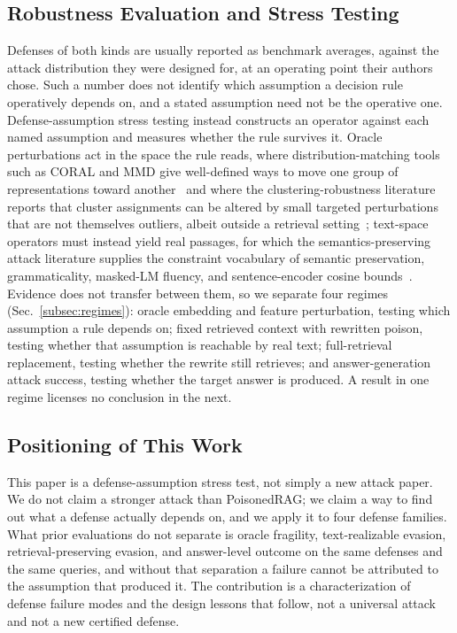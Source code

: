\documentclass[conference]{IEEEtran}
\begin{document}
\subsection{Robustness Evaluation and Stress Testing}
Defenses of both kinds are usually reported as benchmark averages, against the
attack distribution they were designed for, at an operating point their authors
chose. Such a number does not identify which assumption a decision rule
operatively depends on, and a stated assumption need not be the operative one.
Defense-assumption stress testing instead constructs an operator against each
named assumption and measures whether the rule survives it. Oracle perturbations
act in the space the rule reads, where distribution-matching tools such as CORAL
and MMD give well-defined ways to move one group of representations toward
another~\cite{sun2016coral,gretton2012mmd} and where the clustering-robustness
literature reports that cluster assignments can be altered by small targeted
perturbations that are not themselves outliers, albeit outside a retrieval
setting~\cite{chhabra2020clustering,cina2022clustering};
text-space operators must instead yield real passages, for which the
semantics-preserving attack literature supplies the constraint vocabulary of
semantic preservation, grammaticality, masked-LM fluency, and sentence-encoder
cosine bounds~\cite{jin2020textfooler,li2020bertattack,morris2020textattack}.
Evidence does not transfer between them, so we separate four regimes
(Sec.~\ref{subsec:regimes}): oracle embedding and feature perturbation, testing
which assumption a rule depends on; fixed retrieved context with rewritten poison,
testing whether that assumption is reachable by real text; full-retrieval
replacement, testing whether the rewrite still retrieves; and answer-generation
attack success, testing whether the target answer is produced. A result in one
regime licenses no conclusion in the next.

\subsection{Positioning of This Work}
This paper is a defense-assumption stress test, not simply a new attack paper. We
do not claim a stronger attack than PoisonedRAG; we claim a way to find out what
a defense actually depends on, and we apply it to four defense families. What
prior evaluations do not separate is oracle fragility, text-realizable evasion,
retrieval-preserving evasion, and answer-level outcome on the same defenses and
the same queries, and without that separation a failure cannot be attributed to
the assumption that produced it. The contribution is a characterization of defense
failure modes and the design lessons that follow, not a universal attack and not a
new certified defense.
\end{document}
